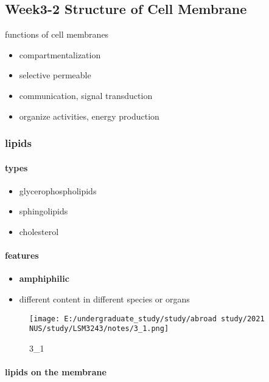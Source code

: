 \documentclass[]{article}
\let\oldparagraph\paragraph
\renewcommand{\paragraph}[1]{\oldparagraph{#1}\mbox{}}
\begin{document}
\hypertarget{week3-2-structure-of-cell-membrane}{%
\subsection{Week3-2 Structure of Cell
Membrane}\label{week3-2-structure-of-cell-membrane}}

functions of cell membranes

\begin{itemize}
\item
  compartmentalization
\item
  selective permeable
\item
  communication, signal transduction
\item
  organize activities, energy production
\end{itemize}

\hypertarget{lipids}{%
\subsubsection{lipids}\label{lipids}}

\hypertarget{types}{%
\paragraph{types}\label{types}}

\begin{itemize}
\item
  glycerophospholipids
\item
  sphingolipids
\item
  cholesterol
\end{itemize}

\hypertarget{features}{%
\paragraph{features}\label{features}}

\begin{itemize}
\item
  \textbf{amphiphilic}
\item
  different content in different species or organs
\end{itemize}

\begin{figure}
\centering
\texttt{[image: E:/undergraduate\_study/study/abroad study/2021 NUS/study/LSM3243/notes/3\_1.png]}
\caption{3\_1}
\end{figure}

\hypertarget{lipids-on-the-membrane}{%
\paragraph{lipids on the membrane}\label{lipids-on-the-membrane}}
\end{document}
